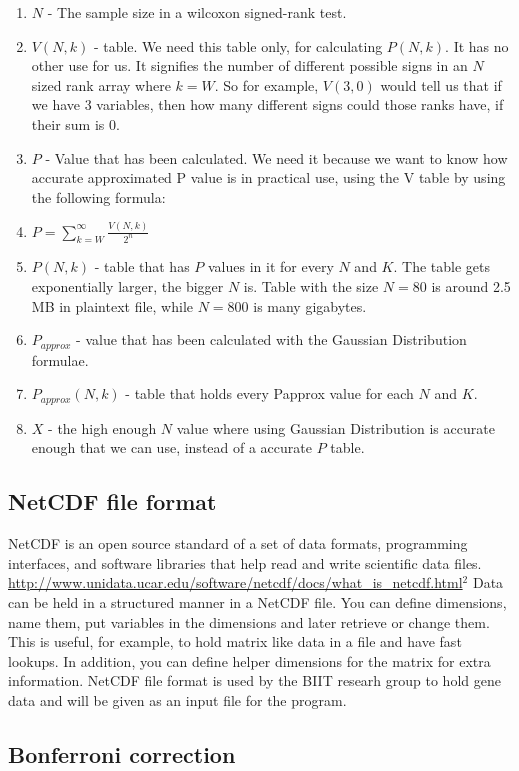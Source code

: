 \documentclass[12pt]{article}
\begin{document}
\begin{enumerate}
\item
$N$ - The sample size in a wilcoxon signed-rank test.
\item
$V(N, k)$ - table. We need this table only, for calculating $P(N, k)$. It has no other use for us. It signifies the number of different possible signs in an $N$ sized rank array where $k = W$.  So for example, $V(3, 0)$ would tell us that if we have 3 variables, then how many different signs could those ranks have, if their sum is 0.
\item
$P$ - Value that has been calculated. We need it because we want to know how accurate approximated P value is in practical use, using the V table by using the following formula:
\item
$P = \sum\limits_{k=W}^{\infty} \frac{V(N, k)}{2^n}$
\item
$P(N, k)$ - table that has $P$ values in it for every $N$ and $K$. The table gets exponentially larger, the bigger $N$ is. Table with the size $N=80$ is around 2.5 MB in plaintext file, while $N=800$ is many gigabytes.
\item
$P_{approx}$ - value that has been calculated with the Gaussian Distribution formulae.
\item
$P_{approx}(N, k)$ - table that holds every Papprox value for each $N$ and $K$.
\item
$X$ - the high enough $N$ value where using Gaussian Distribution is accurate enough that we can use, instead of a accurate $P$ table.
\end{enumerate}

\subsection{NetCDF file format}
NetCDF is an open source standard of a set of data formats, programming interfaces, and software libraries that help read and write scientific data files. \url{http://www.unidata.ucar.edu/software/netcdf/docs/what_is_netcdf.html}$^2$
Data can be held in a structured manner in a NetCDF file. You can define dimensions, name them, put variables in the dimensions and later retrieve or change them. This is useful, for example, to hold matrix like data in a file and have fast lookups. In addition, you can define helper dimensions for the matrix for extra information.
NetCDF file format is used by the BIIT researh group to hold gene data and will be given as an input file for the program.

\subsection{Bonferroni correction}
\end{document}
